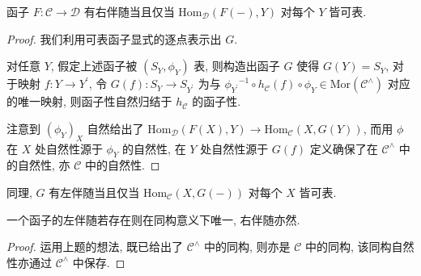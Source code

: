\begin{lemma}
    函子 \(F : \mathcal{C} \to \mathcal{D}\) 有右伴随当且仅当 \(\mathrm{Hom}_{\mathcal{D}} (F (-), Y)\) 对每个 \(Y\) 皆可表.

    \begin{proof}
        我们利用可表函子显式的逐点表示出 \(G\).

        对任意 \(Y\), 假定上述函子被 \((S_Y, \phi_Y)\) 表, 则构造出函子 \(G\) 使得 \(G(Y) = S_Y\),
        对于映射 \(f : Y \to Y^\prime\), 令 \(G(f) : S_Y \to S_{Y^\prime}\) 为与 \({\phi_{Y^\prime}}^{-1} \circ h_{\mathcal{C}} (f) \circ \phi_Y \in \mathrm{Mor} (\mathcal{C}^{\wedge})\)
        对应的唯一映射, 则函子性自然归结于 \(h_\mathcal{C}\) 的函子性.

        注意到 \({(\phi_Y)}_X\) 自然给出了 \(\mathrm{Hom}_{\mathcal{D}} (F (X), Y) \to \mathrm{Hom}_{\mathcal{C}} (X, G(Y))\),
        而用 \(\phi\) 在 \(X\) 处自然性源于 \(\phi_Y\) 的自然性, 在 \(Y\) 处自然性源于 \(G(f)\) 定义确保了在 \(\mathcal{C}^{\wedge}\) 中的自然性, 亦 \(\mathcal{C}\) 中的自然性.
    \end{proof}
\end{lemma}

\begin{corollary}
    同理, \(G\) 有左伴随当且仅当 \(\mathrm{Hom}_{\mathcal{C}} (X, G (-))\) 对每个 \(X\) 皆可表.
\end{corollary}

\begin{lemma}
    一个函子的左伴随若存在则在同构意义下唯一, 右伴随亦然.

    \begin{proof}
        运用上题的想法, 既已给出了 \(\mathcal{C}^{\wedge}\) 中的同构, 则亦是 \(\mathcal{C}\) 中的同构,
        该同构自然性亦通过 \(\mathcal{C}^{\wedge}\) 中保存.
    \end{proof}
\end{lemma}

